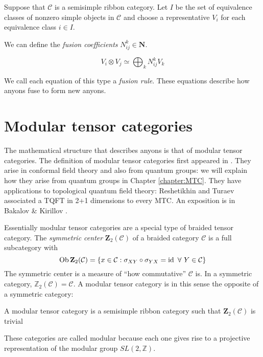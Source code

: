     Suppose that $\mathcal{C}$ is a semisimple ribbon category. Let $I$ be the
    set of equivalence classes of nonzero simple objects in $\mathcal{C}$ and
    choose a representative $V_i$ for each equivalence class  $i \in I$.
    
    We can define the \emph{fusion coefficients} $N_{ij}^k \in \mathbf{N}$.

    \begin{equation}
        V_i \otimes V_j \simeq \bigoplus_k N_{ij}^k V_k
    \end{equation}

    We call each equation of this type a \emph{fusion rule}. These equations
    describe how anyons fuse to form new anyons.

\section{Modular tensor categories}
\label{section:MTCs}
    The mathematical structure that describes anyons is that of modular tensor
    categories. 
    The definition of modular tensor categories first appeared in \cite{MS}.
    They arise in conformal field theory and also from quantum groups: we will
    explain how they arise from quantum groups in Chapter \ref{chapter:MTC}.
    They have applications to topological quantum field theory: Reshetikhin and
    Turaev associated a TQFT in 2+1 dimensions to every MTC. An exposition is
    in Bakalov \& Kirillov \cite{Kirillov2001}.

    Essentially modular tensor categories are a special type of braided tensor
    category.  The \emph{symmetric center} $\mathbf{Z}_2(\mathcal{C})$ of a
    braided category $\mathcal{C}$ is a full subcategory with 
    \begin{equation}
        \operatorname{Ob} \mathbf{Z}_2(\mathcal{C}) = \left\{ x \in \mathcal{C} : \sigma_{XY} \circ \sigma_{YX} = \operatorname{id}\ \forall\ Y \in \mathcal{C} \right\}
    \end{equation}
    The symmetric center is a measure of ``how commutative'' $\mathcal{C}$ is. In
    a symmetric category, $\mathbb{Z}_2(\mathcal{C}) = \mathcal{C}$. A modular
    tensor category is in this sense the opposite of a symmetric category:

\begin{defn}
    A modular tensor category is a semisimple ribbon category such that
    $\mathbf{Z}_2(\mathcal{C})$ is trivial
\end{defn}

These categories are called modular because each one gives rise to a projective representation of the modular group $SL(2, \mathbb{Z})$.

